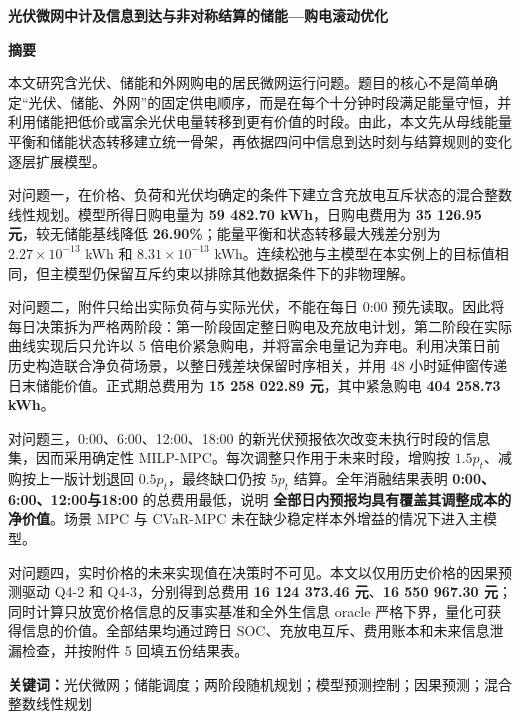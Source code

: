 \documentclass[12pt,a4paper]{ctexart}
\begin{document}
\thispagestyle{empty}
\begin{center}\bfseries{} 光伏微网中计及信息到达与非对称结算的储能—购电滚动优化\end{center}
\vspace{0.5em}
\begin{center}\bfseries{} 摘\quad 要\end{center}
本文研究含光伏、储能和外网购电的居民微网运行问题。题目的核心不是简单确定“光伏、储能、外网”的固定供电顺序，而是在每个十分钟时段满足能量守恒，并利用储能把低价或富余光伏电量转移到更有价值的时段。由此，本文先从母线能量平衡和储能状态转移建立统一骨架，再依据四问中信息到达时刻与结算规则的变化逐层扩展模型。

对问题一，在价格、负荷和光伏均确定的条件下建立含充放电互斥状态的混合整数线性规划。模型所得日购电量为 \textbf{59 482.70 kWh}，日购电费用为 \textbf{35 126.95 元}，较无储能基线降低 \textbf{26.90\%}；能量平衡和状态转移最大残差分别为 $2.27\times10^{-13}$ kWh 和 $8.31\times10^{-13}$ kWh。连续松弛与主模型在本实例上的目标值相同，但主模型仍保留互斥约束以排除其他数据条件下的非物理解。

对问题二，附件只给出实际负荷与实际光伏，不能在每日 0:00 预先读取。因此将每日决策拆为严格两阶段：第一阶段固定整日购电及充放电计划，第二阶段在实际曲线实现后只允许以 5 倍电价紧急购电，并将富余电量记为弃电。利用决策日前历史构造联合净负荷场景，以整日残差块保留时序相关，并用 48 小时延伸窗传递日末储能价值。正式期总费用为 \textbf{15 258 022.89 元}，其中紧急购电 \textbf{404 258.73 kWh}。

对问题三，0:00、6:00、12:00、18:00 的新光伏预报依次改变未执行时段的信息集，因而采用确定性 MILP-MPC。每次调整只作用于未来时段，增购按 $1.5p_t$、减购按上一版计划退回 $0.5p_t$，最终缺口仍按 $5p_t$ 结算。全年消融结果表明 \textbf{0:00、6:00、12:00与18:00} 的总费用最低，说明 \textbf{全部日内预报均具有覆盖其调整成本的净价值}。场景 MPC 与 CVaR-MPC 未在缺少稳定样本外增益的情况下进入主模型。

对问题四，实时价格的未来实现值在决策时不可见。本文以仅用历史价格的因果预测驱动 Q4-2 和 Q4-3，分别得到总费用 \textbf{16 124 373.46 元}、\textbf{16 550 967.30 元}；同时计算只放宽价格信息的反事实基准和全外生信息 oracle 严格下界，量化可获得信息的价值。全部结果均通过跨日 SOC、充放电互斥、费用账本和未来信息泄漏检查，并按附件 5 回填五份结果表。

\vfill
\noindent\textbf{关键词：}光伏微网；储能调度；两阶段随机规划；模型预测控制；因果预测；混合整数线性规划
\clearpage
\setcounter{page}{1}
\end{document}
